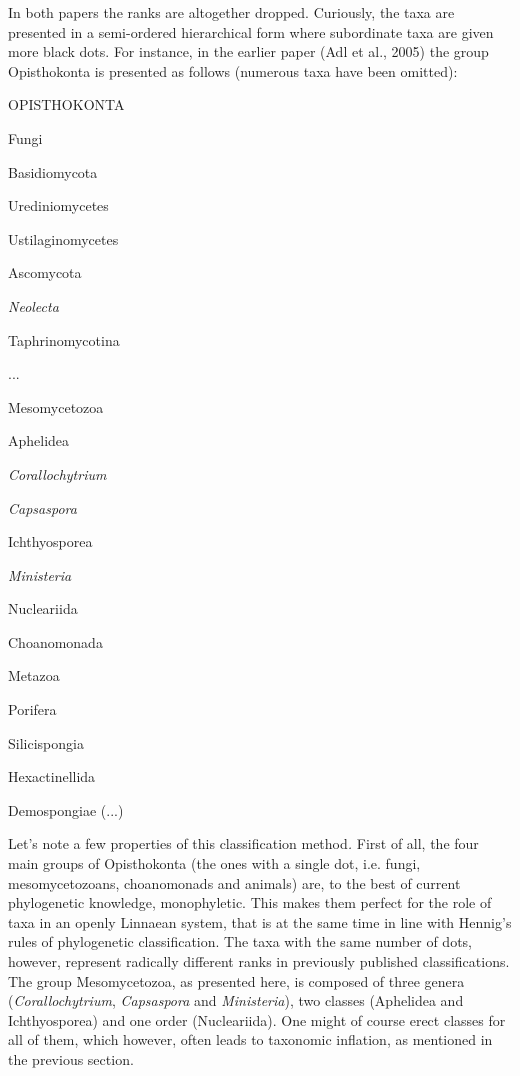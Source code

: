\documentclass[a4paper]{article}
\begin{document}
In both papers the ranks are altogether dropped. Curiously, the taxa are presented in a semi-ordered hierarchical form
where subordinate taxa are given more black dots. For instance, in the earlier paper \label{ref:RNDFR1OTfHJvd}(Adl et
al., 2005) the group Opisthokonta is presented as follows (numerous taxa have been omitted):

OPISTHOKONTA

 Fungi

 Basidiomycota

 Urediniomycetes

 Ustilaginomycetes

 Ascomycota

 \textit{Neolecta}

 Taphrinomycotina

...

 Mesomycetozoa

 Aphelidea

 \textit{Corallochytrium}

 \textit{Capsaspora}

 Ichthyosporea

 \textit{Ministeria}

 Nucleariida

 Choanomonada

 Metazoa

 Porifera

 Silicispongia

 Hexactinellida

 Demospongiae (...)

Let’s note a few properties of this classification method\textit{.} First of all, the four main groups of Opisthokonta
(the ones with a single dot, i.e. fungi, mesomycetozoans, choanomonads and animals) are, to the best of current
phylogenetic knowledge, monophyletic. This makes them perfect for the role of taxa in an openly Linnaean system, that
is at the same time in line with Hennig’s rules of phylogenetic classification. The taxa with the same number of dots,
however, represent radically different ranks in previously published classifications. The group Mesomycetozoa, as
presented here, is composed of three genera (\textit{Corallochytrium}, \textit{Capsaspora} and \textit{Ministeria}),
two classes (Aphelidea and Ichthyosporea) and one order (Nucleariida). One might of course erect classes for all of
them, which however, often leads to taxonomic inflation, as mentioned in the previous section.
\end{document}
